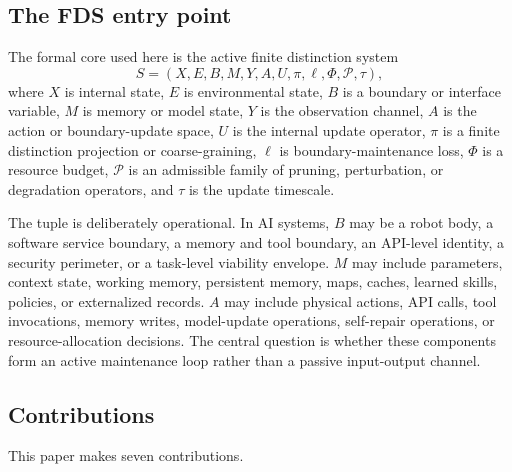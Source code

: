 \documentclass[10pt,a4paper,twocolumn,aps,prl]{revtex4-2}
\begin{document}
\subsection{The FDS entry point}

The formal core used here is the active finite distinction system
\begin{equation}
S=(X,E,B,M,Y,A,U,\pi,\ell,\Phi,\mathcal{P},\tau),
\label{eq:fds-tuple-intro}
\end{equation}
where $X$ is internal state, $E$ is environmental state, $B$ is a boundary or interface variable, $M$ is memory or model state, $Y$ is the observation channel, $A$ is the action or boundary-update space, $U$ is the internal update operator, $\pi$ is a finite distinction projection or coarse-graining, $\ell$ is boundary-maintenance loss, $\Phi$ is a resource budget, $\mathcal{P}$ is an admissible family of pruning, perturbation, or degradation operators, and $\tau$ is the update timescale.

The tuple is deliberately operational. In AI systems, $B$ may be a robot body, a software service boundary, a memory and tool boundary, an API-level identity, a security perimeter, or a task-level viability envelope. $M$ may include parameters, context state, working memory, persistent memory, maps, caches, learned skills, policies, or externalized records. $A$ may include physical actions, API calls, tool invocations, memory writes, model-update operations, self-repair operations, or resource-allocation decisions. The central question is whether these components form an active maintenance loop rather than a passive input-output channel.

\subsection{Contributions}

This paper makes seven contributions.
\end{document}
